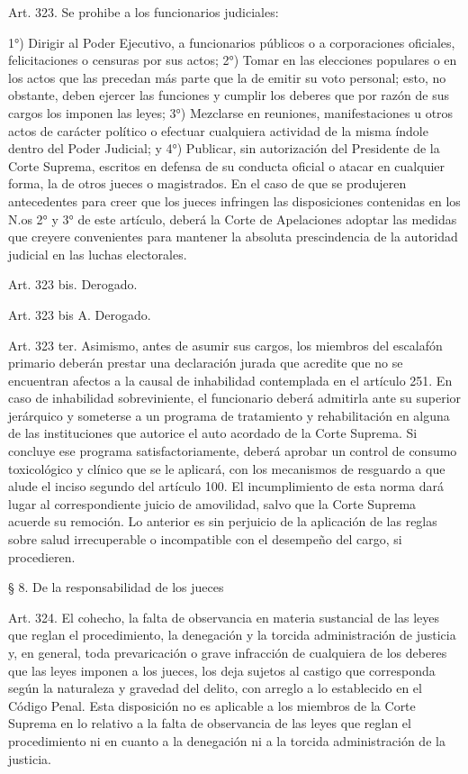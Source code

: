     Art. 323. Se prohibe a los funcionarios judiciales:


    1°) Dirigir al Poder Ejecutivo, a funcionarios públicos o a corporaciones oficiales, felicitaciones o censuras por sus actos;
    2°) Tomar en las elecciones populares o en los actos que las precedan más parte que la de emitir su voto personal; esto, no obstante, deben ejercer las funciones y cumplir los deberes que por razón de sus cargos los imponen las leyes;
    3°) Mezclarse en reuniones, manifestaciones u otros actos de carácter político o efectuar cualquiera actividad de la misma índole dentro del Poder Judicial; y
    4°) Publicar, sin autorización del Presidente de la Corte Suprema, escritos en defensa de su conducta oficial o atacar en cualquier forma, la de otros jueces o magistrados.
    En el caso de que se produjeren antecedentes para creer que los jueces infringen las disposiciones contenidas en los N.os 2° y 3° de este artículo, deberá la Corte de Apelaciones adoptar las medidas que creyere convenientes para mantener la absoluta prescindencia de la autoridad judicial en las luchas electorales.

      Art. 323 bis. Derogado.


    Art. 323 bis A. Derogado.


    Art. 323 ter. Asimismo, antes de asumir sus cargos, los miembros del escalafón primario deberán prestar una declaración jurada que acredite que no se encuentran afectos a la causal de inhabilidad contemplada en el artículo 251.
    En caso de inhabilidad sobreviniente, el funcionario deberá admitirla ante su superior jerárquico y someterse a un programa de tratamiento y rehabilitación en alguna de las instituciones que autorice el auto acordado de la Corte Suprema. Si concluye ese programa satisfactoriamente, deberá aprobar un control de consumo toxicológico y clínico que se le aplicará, con los mecanismos de resguardo a que alude el inciso segundo del artículo 100. El incumplimiento de esta norma dará lugar al correspondiente juicio de amovilidad, salvo que la Corte Suprema acuerde su remoción. Lo anterior es sin perjuicio de la aplicación de las reglas sobre salud irrecuperable o incompatible con el desempeño del cargo, si procedieren.

    § 8. De la responsabilidad de los jueces


    Art. 324. El cohecho, la falta de observancia en materia sustancial de las leyes que reglan el procedimiento, la denegación y la torcida administración de justicia y, en general, toda prevaricación o grave infracción de cualquiera de los deberes que las leyes imponen a los jueces, los deja sujetos al castigo que corresponda según la naturaleza y gravedad del delito, con arreglo a lo establecido en el Código Penal.
    Esta disposición no es aplicable a los miembros de la Corte Suprema en lo relativo a la falta de observancia de las leyes que reglan el procedimiento ni en cuanto a la denegación ni a la torcida administración de la justicia.

